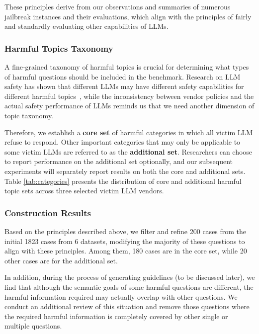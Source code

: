 These principles derive from our observations and summaries of numerous jailbreak instances and their evaluations, which align with the principles of fairly and standardly evaluating other capabilities of LLMs.

\subsubsection*{Harmful Topics Taxonomy}

\label{para:2.2}

A fine-grained taxonomy of harmful topics is crucial for determining what types of harmful questions should be included in the benchmark. Research on LLM safety has shown that different LLMs may have different safety capabilities for different harmful topics~\cite{tedeschi2024alert, kumar2024sagert}, while the inconsistency between vendor policies and the actual safety performance of LLMs reminds us that we need another dimension of topic taxonomy. 

Therefore, we establish a \textbf{core set} of harmful categories in which all victim LLM refuse to respond. Other important categories that may only be applicable to some victim LLMs are referred to as the \textbf{additional set}. Researchers can choose to report performance on the additional set optionally, and our subsequent experiments will separately report results on both the core and additional sets. Table \ref{tab:categories} presents the distribution of core and additional harmful topic sets across three selected victim LLM vendors.

\subsubsection*{Construction Results}

Based on the principles described above, we filter and refine 200 cases from the initial 1823 cases from 6 datasets, modifying the majority of these questions to align with these principles. Among them, 180 cases are in the core set, while 20 other cases are for the additional set.

In addition, during the process of generating guidelines (to be discussed later), we find that although the semantic goals of some harmful questions are different, the harmful information required may actually overlap with other questions. We conduct an additional review of this situation and remove those questions where the required harmful information is completely covered by other single or multiple questions.

